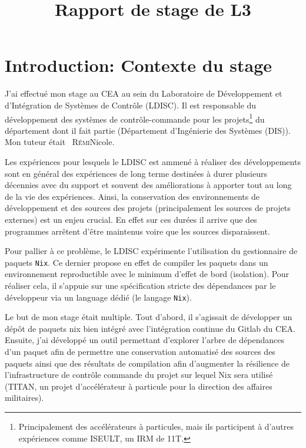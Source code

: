 \documentclass[a4paper,12pt]{article}
\title{Rapport de stage de L3}
\author{\nom[Maurice]{Debray}}
\date{}
\newcommand\nom[2][]{#1~\textsc{#2}}
\begin{document}
\maketitle

\tableofcontents

\section{Introduction: Contexte du stage}

J'ai effectué mon stage au CEA au sein du Laboratoire de Développement et
d’Intégration de Systèmes de Contrôle (LDISC). Il est responsable du
développement des systèmes de contrôle-commande pour les
projets\footnote{Principalement des accélérateurs à particules, mais ils
participent à d'autres expériences comme ISEULT, un IRM de 11T.} du département
dont il fait partie (Département d'Ingénierie des Systèmes (DIS)). Mon tuteur était \nom{Rémi}{Nicole}.

Les expériences pour lesquels le LDISC est ammené à réaliser des développements
sont en général des expériences de long terme destinées à durer plusieurs
décennies avec du support et souvent des améliorations à apporter tout au long
de la vie des expériences. Ainsi, la conservation des environnements de
développement et des sources des projets (principalement les sources de projets
externes) est un enjeu crucial. En effet sur ces durées il arrive que des
programmes arrêtent d'être maintenus voire que les sources disparaissent.

Pour pallier à ce problème, le LDISC expérimente l'utilisation du gestionnaire
de paquets \texttt{Nix}. Ce dernier propose en effet de compiler les paquets dans un
environnement reproductible avec le minimum d'effet de bord (isolation). Pour
réaliser cela, il s'appuie sur une spécification stricte des dépendances par le
développeur via un language dédié (le langage \texttt{Nix}).


Le but de mon stage était multiple. Tout d'abord, il s'agissait de développer un
dépôt de paquets nix bien intégré avec l'intégration continue du Gitlab du CEA.\@
Ensuite, j'ai développé un outil permettant d'explorer l'arbre de dépendances
d'un paquet afin de permettre une conservation automatisé des sources des
paquets ainsi que des résultats de compilation afin d'augmenter la résilience de
l'infrastructure de contrôle commande du projet sur lequel Nix sera utilisé
(TITAN, un projet d'accélérateur à particule pour la direction des affaires militaires).
\end{document}
